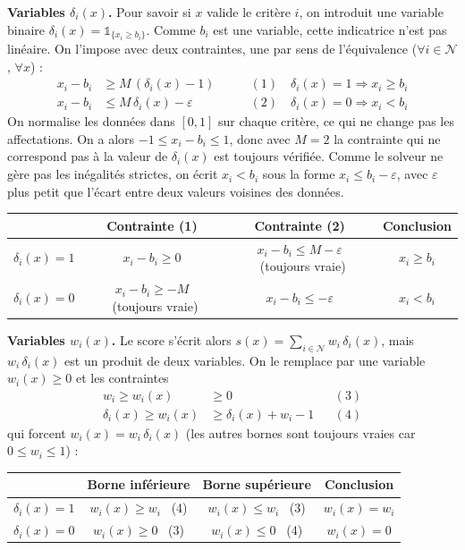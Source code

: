 \documentclass[10pt,a4paper]{article}
\newcommand{\N}{\mathcal{N}}
\begin{document}
\textbf{Variables $\delta_i(x)$.} Pour savoir si $x$ valide le critère $i$, on introduit une variable binaire $\delta_i(x)=\mathds{1}_{\{x_i\geq b_i\}}$. Comme $b_i$ est
une variable, cette indicatrice n'est pas linéaire. On l'impose avec deux contraintes, une par sens de l'équivalence
($\forall i\in\N$, $\forall x$) :
\begin{align*}
x_i-b_i &\geq M\,(\delta_i(x)-1) &\qquad (1)\quad \delta_i(x)=1 \Rightarrow x_i\geq b_i \\
x_i-b_i &\leq M\,\delta_i(x)-\varepsilon &\qquad (2)\quad \delta_i(x)=0 \Rightarrow x_i< b_i
\end{align*}
On normalise les données dans $[0,1]$ sur chaque critère, ce qui ne change pas les affectations. On a alors
$-1\leq x_i-b_i\leq 1$, donc avec $M=2$ la contrainte qui ne correspond pas à la valeur de $\delta_i(x)$ est toujours
vérifiée. Comme le solveur ne gère pas les inégalités strictes, on écrit $x_i<b_i$ sous la forme $x_i\leq b_i-\varepsilon$,
avec $\varepsilon$ plus petit que l'écart entre deux valeurs voisines des données.

\begin{center}
\begin{tabular}{cccc}
\toprule
 & Contrainte (1) & Contrainte (2) & Conclusion \\
\midrule
$\delta_i(x)=1$ & $x_i-b_i\geq 0$ & $x_i-b_i\leq M-\varepsilon$ \ (toujours vraie) & $x_i\geq b_i$ \\
$\delta_i(x)=0$ & $x_i-b_i\geq -M$ \ (toujours vraie) & $x_i-b_i\leq-\varepsilon$ & $x_i<b_i$ \\
\bottomrule
\end{tabular}
\end{center}

\textbf{Variables $w_i(x)$.} Le score s'écrit alors $s(x)=\sum_{i\in\N} w_i\,\delta_i(x)$, mais $w_i\,\delta_i(x)$ est un produit
de deux variables. On le remplace par une variable $w_i(x)\geq 0$ et les contraintes
\begin{align*}
w_i \geq w_i(x) &\geq 0 && (3)\\
\delta_i(x) \geq w_i(x) &\geq \delta_i(x)+w_i-1 && (4)
\end{align*}
qui forcent $w_i(x)=w_i\,\delta_i(x)$ (les autres bornes sont toujours vraies car $0\leq w_i\leq 1$) :

\begin{center}
\begin{tabular}{cccc}
\toprule
 & Borne inférieure & Borne supérieure & Conclusion \\
\midrule
$\delta_i(x)=1$ & $w_i(x)\geq w_i$ \ (4) & $w_i(x)\leq w_i$ \ (3) & $w_i(x)=w_i$ \\
$\delta_i(x)=0$ & $w_i(x)\geq 0$ \ (3) & $w_i(x)\leq 0$ \ (4) & $w_i(x)=0$ \\
\bottomrule
\end{tabular}
\end{center}
\end{document}
